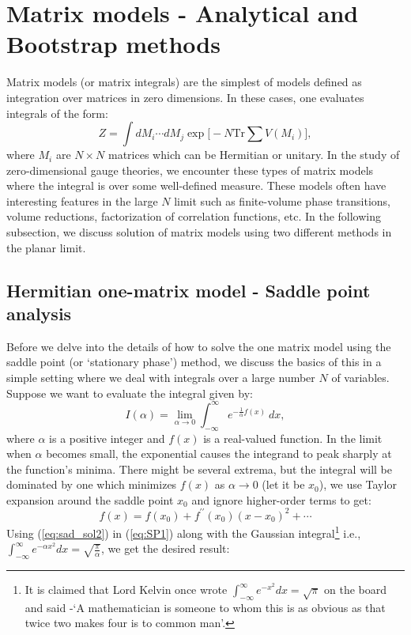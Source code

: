 \documentclass[letter,11pt]{article}
\begin{document}
\section{\label{sec:MMAres}Matrix models - Analytical and Bootstrap methods} 
Matrix models (or matrix integrals) are the simplest of models 
defined as integration over matrices in zero dimensions. 
In these cases, one evaluates integrals of the form:
\begin{equation}
Z = \int dM_{i} \cdots dM_{j} \exp\Bigg[-N \mathrm{Tr} \sum V(M_{i})\Bigg] ,
\end{equation}
where $M_{i}$ are $N \times N$ matrices which can be Hermitian or unitary.  
In the study of zero-dimensional gauge theories, we encounter these types of matrix models where the integral is over some well-defined measure. 
These models often have interesting features in the large $N$ limit such as finite-volume phase transitions, 
volume reductions, factorization of correlation functions, etc. In the following subsection, we discuss solution of 
matrix models using two different methods in the planar limit. 

\subsection{Hermitian one-matrix model - Saddle point analysis}
Before we delve into the details of how to solve the one matrix model using the saddle point (or `stationary phase') method, we discuss the basics of this in a simple setting where we deal with integrals over a large number $N$ of variables. Suppose we want to evaluate the integral given by:
\begin{equation}
\label{eq:SP1} 
I(\alpha) = \lim_{\alpha \to 0} \int_{-\infty}^{\infty} e^{-\frac{1}{\alpha}f(x)} ~dx, 
\end{equation}
where $\alpha$ is a positive integer and $f(x)$ is a real-valued function. In the limit when $\alpha$ becomes small, the exponential causes the integrand to peak sharply at the function's minima. There might be several extrema, but the integral will be dominated by one which minimizes $f(x)$ as $\alpha \to 0$ (let it be $x_{0}$), 
we use Taylor expansion around the saddle point $x_{0}$ and ignore higher-order terms to get:
\begin{equation}
	\label{eq:sad_sol2}
	f(x) = f(x_{0}) + f^{\prime\prime}(x_{0}) (x-x_0)^{2} + \cdots 
\end{equation}
Using (\ref{eq:sad_sol2}) in (\ref{eq:SP1}) along with the Gaussian integral\footnote{It is claimed that Lord Kelvin once wrote $\int_{-\infty}^{\infty}e^{-x^2} dx = \sqrt{\pi}$ on the board and said -`A mathematician is someone to whom this is as obvious as that 
twice two makes four is to common man'.} 
i.e., $\int_{-\infty}^{\infty} e^{-\alpha x^2} dx = \sqrt{\frac{\pi}{\alpha}}$, we get the desired result:
\end{document}
